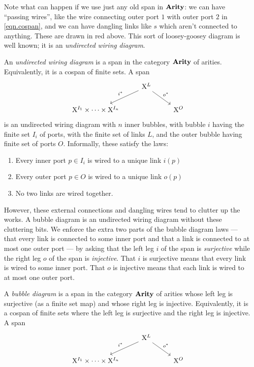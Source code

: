 \documentclass[DynamicalBook]{subfiles}
\begin{document}
Note what can happen if we use just any old span in $\textbf{Arity}$: we can have
``passing wires'', like the wire connecting outer port $1$ with outer port $2$
in \cref{eqn.cospan}, and we can have dangling links like $s$ which aren't
connected to anything. These are drawn in red above. This sort of loosey-goosey diagram is well known; it is
an \emph{undirected wiring diagram}.
\begin{definition}
  An \emph{undirected wiring diagram} is a span in the category $\textbf{Arity}$ of
  arities. Equivalently, it is a cospan of finite sets. A span
\[
\begin{tikzcd}
	& {\XX^L} \\
	{\XX^{I_1} \times \cdots \times \XX^{I_n}} && {\XX^O}
	\arrow["{i^{\ast}}"', from=1-2, to=2-1]
	\arrow["{o^{\ast}}", from=1-2, to=2-3]
\end{tikzcd}
\]
is an undirected wiring diagram with $n$ inner bubbles, with bubble $i$ having
the finite set $I_i$ of ports, with the finite set of links $L$, and the outer
bubble having finite set of ports $O$. Informally, these satisfy the laws:
\begin{enumerate}
  \item Every inner port $p \in I_i$ is wired to a unique link $i(p)$
  \item Every outer port $p \in O$ is wired to a unique link $o(p)$
  \item No two links are wired together.
\end{enumerate}

\end{definition}

However, these external connections and dangling wires tend to clutter up the
works. A bubble diagram is an undirected wiring diagram without these cluttering
bits. We enforce the extra two parts of the bubble diagram laws --- that every
link is connected to some inner port and that a link is connected to at most one
outer port --- by asking that the left leg $i$ of the span is \emph{surjective}
while the right leg $o$ of the span is \emph{injective}. That $i$ is surjective
means that every link is wired to some inner port. That $o$ is injective means
that each link is wired to at most one outer port.

\begin{definition}
 A \emph{bubble diagram} is a span in the category $\textbf{Arity}$ of
  arities whose left leg is surjective (as a finite set map) and whose right leg is injective. Equivalently, it is a cospan of finite sets where the left leg is surjective and the right leg is injective. A span
\[
\begin{tikzcd}
	& {\XX^L} \\
	{\XX^{I_1} \times \cdots \times \XX^{I_n}} && {\XX^O}
	\arrow["{i^{\ast}}"', from=1-2, to=2-1]
	\arrow["{o^{\ast}}", from=1-2, to=2-3]
\end{tikzcd}
\]
\end{definition}
\end{document}
